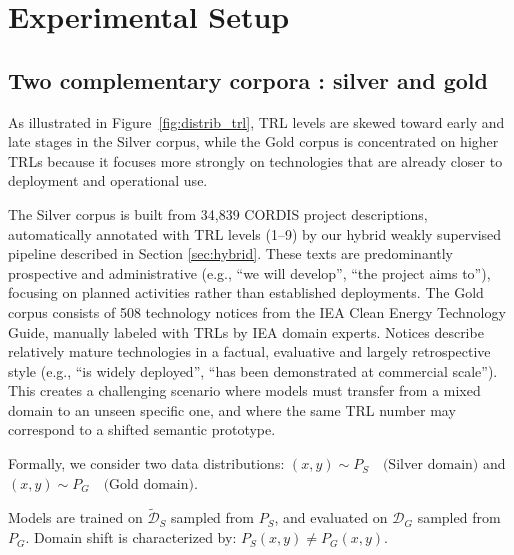 \documentclass[runningheads]{llncs}
\begin{document}
\section{Experimental Setup}
\label{sec:setup}
\subsection{Two complementary corpora : silver and gold}
As illustrated in Figure~\ref{fig:distrib_trl}, TRL levels are skewed toward early and late stages in the Silver corpus, while the Gold corpus is concentrated on higher TRLs because it focuses more strongly on technologies that are already closer to deployment and operational use.


The Silver corpus is built from 34,839 CORDIS project descriptions, automatically annotated with TRL levels (1–9) by our hybrid weakly supervised pipeline described in Section \ref{sec:hybrid}. 
These texts are predominantly prospective and administrative (e.g., “we will develop”, “the project aims to”), focusing on planned activities rather than established deployments. The Gold corpus consists of 508 technology notices from the IEA Clean Energy Technology Guide, manually labeled with TRLs by IEA domain experts. Notices describe relatively mature technologies in a factual, evaluative and largely retrospective style (e.g., “is widely deployed”, “has been demonstrated at commercial scale”). %
This creates a challenging scenario where models must transfer from a mixed domain to an unseen specific one, and where the same TRL number may correspond to a shifted semantic prototype.

\color{red}
Formally, we consider two data distributions:
\(
(x, y) \sim P_S \quad \text{(Silver domain)} \) and \( 
(x, y) \sim P_G \quad \text{(Gold domain)}.
\)

Models are trained on $\tilde{\mathcal{D}}_S$ sampled from $P_S$, and evaluated on $\mathcal{D}_G$ sampled from $P_G$. Domain shift is characterized by: \(P_S(x,y) \neq P_G(x,y)\).
\color{black}

\end{document}
